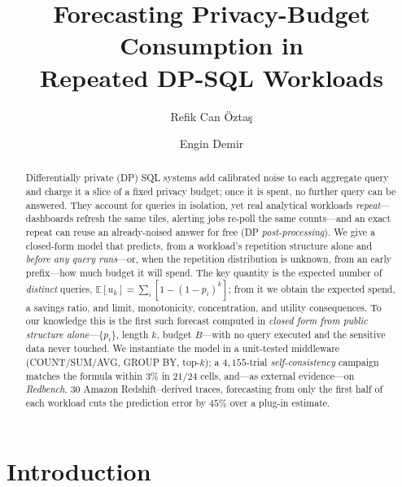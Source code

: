 \documentclass[runningheads]{llncs}
\newcommand{\E}{\mathbb{E}}
\begin{document}
\title{Forecasting Privacy-Budget Consumption in\\ Repeated DP-SQL Workloads}

\author{Refik Can \"Ozta\c{s} \and Engin Demir}

\maketitle

\begin{abstract}
Differentially private (DP) SQL systems add calibrated noise to each aggregate query and charge it a slice of a fixed privacy budget; once it is spent, no further query can be answered. They account for queries in isolation, yet real analytical workloads \emph{repeat}---dashboards refresh the same tiles, alerting jobs re-poll the same counts---and an exact repeat can reuse an already-noised answer for free (DP \emph{post-processing}). We give a closed-form model that predicts, from a workload's repetition structure alone and \emph{before any query runs}---or, when the repetition distribution is unknown, from an early prefix---how much budget it will spend. The key quantity is the expected number of \emph{distinct} queries, $\E[u_k]=\sum_i[1-(1-p_i)^k]$; from it we obtain the expected spend, a savings ratio, and limit, monotonicity, concentration, and utility consequences. To our knowledge this is the first such forecast computed in \emph{closed form from public structure alone}---$\{p_i\}$, length $k$, budget $B$---with no query executed and the sensitive data never touched. We instantiate the model in a unit-tested middleware (COUNT/SUM/AVG, GROUP BY, top-$k$); a $4{,}155$-trial \emph{self-consistency} campaign matches the formula within $3\%$ in $21/24$ cells, and---as external evidence---on \emph{Redbench}, $30$ Amazon Redshift--derived traces, forecasting from only the first half of each workload cuts the prediction error by $45\%$ over a plug-in estimate.
\end{abstract}

\section{Introduction}
\label{sec:intro}
\end{document}
